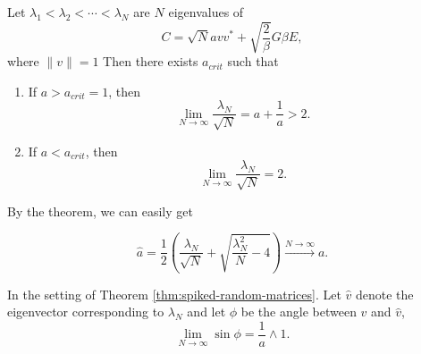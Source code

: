 \begin{thm}
    Let $\lambda_1<\lambda_2<\cdots<\lambda_N$ are $N$ eigenvalues of 
    \[
    C = \sqrt{N}a vv^* +\sqrt{\frac{2}{\beta}}G\beta E,
    \]
    where $\|v\|=1$
    Then there exists $a_{crit}$ such that
    \begin{enumerate}
        \item If $a>a_{crit} = 1$, then 
        \[
        \lim_{N\to\infty} \frac{\lambda_N}{\sqrt{N}} = a+\frac{1}{a} >2.
        \]
        \item If $a<a_{crit}$, then 
        \[
        \lim_{N\to\infty} \frac{\lambda_N}{\sqrt{N}} = 2.
        \]
    \end{enumerate}
    \label{thm:spiked-random-matrices}
\end{thm}
By the theorem, we can easily get
\begin{cor}
    \[
    \hat{a} = \frac{1}{2}\left(
    \frac{\lambda_N}{\sqrt{N}}+\sqrt{\frac{\lambda_N^2}{N}-4}
    \right) \overset{N\to\infty}{\longrightarrow} a.
    \]
\end{cor}
\begin{thm}[Recover $v$]
    \label{thm:9.2}
    In the setting of Theorem \ref{thm:spiked-random-matrices}. Let $\hat{v}$ denote the eigenvector corresponding to $\lambda_N$ and let $\phi$ be the angle between $v$ and $\hat{v}$,
    \[
    \lim_{N\to\infty} \sin\phi = \frac{1}{a} \wedge 1.
    \]
\end{thm}
